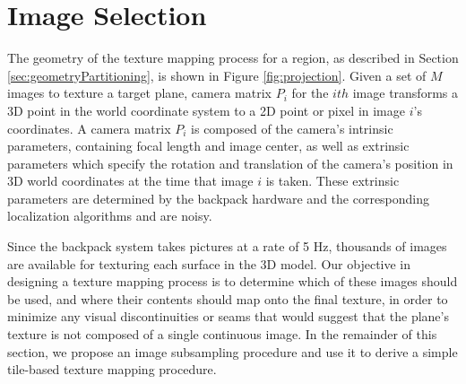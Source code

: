 \documentclass[]{spie}  %
\begin{document}
\section{Image Selection}
\label{sec:imageSelection}

The geometry of the texture mapping process for a region, as described
in Section \ref{sec:geometryPartitioning}, is shown in Figure
\ref{fig:projection}. Given a set of $M$ images to texture a target
plane, camera matrix $P_i$ for the $ith$ image transforms a 3D point
in the world coordinate system to a 2D point or pixel in image $i$'s
coordinates. A camera matrix $P_i$ is composed of the camera's
intrinsic parameters, containing focal length and image center, as
well as extrinsic parameters which specify the rotation and
translation of the camera's position in 3D world coordinates at the
time that image $i$ is taken. These extrinsic parameters are
determined by the backpack hardware and the corresponding localization
algorithms \cite{chen2010indoor, liu2010indoor, kua2012loopclosure}
and are noisy.

Since the backpack system takes pictures at a rate of 5 Hz, thousands
of images are available for texturing each surface in the 3D
model. Our objective in designing a texture mapping process is to
determine which of these images should be used, and where their
contents should map onto the final texture, in order to minimize any
visual discontinuities or seams that would suggest that the plane's
texture is not composed of a single continuous image. In the remainder
of this section, we propose an image subsampling procedure and use it
to derive a simple tile-based texture mapping procedure.
\end{document}
